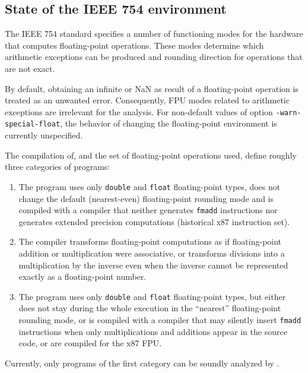 \documentclass{frama-c-book}
\begin{document}

\subsection{State of the IEEE 754 environment}

The IEEE 754 standard specifies a number of functioning modes for
the hardware that computes floating-point operations. These modes
determine which arithmetic exceptions can be produced and rounding
direction for operations that are not exact.

By default, obtaining an
infinite or NaN as result of a floating-point operation is treated
as an unwanted error. Consequently, FPU modes related to arithmetic
exceptions are irrelevant for the analysis.
For non-default values of option \texttt{-warn-special-float}, the
behavior of changing the floating-point environment is currently unspecified.


The compilation of, and the set of floating-point operations used, define
roughly three categories of programs:
\begin{enumerate}

\item The program uses only
\lstinline|double| and \lstinline|float| floating-point types,
does not change the default (nearest-even) floating-point rounding
mode and is compiled with a compiler that neither generates
\lstinline|fmadd| instructions nor generates extended precision computations
(historical x87 instruction set).

\item The compiler transforms floating-point computations
as if floating-point addition or multiplication were associative,
or transforms divisions into a multiplication by the inverse even when
the inverse cannot be represented exactly as a floating-point number.

\item The program uses only
\lstinline|double| and \lstinline|float| floating-point types,
but either does not stay during the whole
execution in the ``nearest'' floating-point rounding mode, or is
compiled with a compiler that may silently insert \lstinline|fmadd|
instructions when only multiplications and additions appear in the
source code, or are compiled for the x87 FPU. %
\end{enumerate}
%
Currently, only programs of the first category can be soundly analyzed by
\Eva{}.
\end{document}
